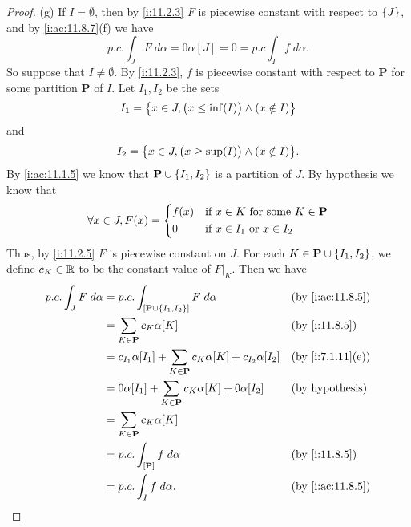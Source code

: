 \begin{proof}{(g)}
  If \(I = \emptyset\), then by \cref{i:11.2.3} \(F\) is piecewise constant with respect to \(\left\lbrace J\right\rbrace\), and by \cref{i:ac:11.8.7}(f) we have
  \[
    p.c. \int_J F \; d \alpha = 0 \alpha[J] = 0 = p.c \int_I f \; d \alpha.
  \]
  So suppose that \(I \neq \emptyset\).
  By \cref{i:11.2.3}, \(f\) is piecewise constant with respect to \(\mathbf{P}\) for some partition \(\mathbf{P}\) of \(I\).
  Let \(I_1, I_2\) be the sets
  \[
    I_1 = \left\lbrace x \in J, \big(x \leq \inf(I)\big) \land (x \notin I)\right\rbrace
  \]
  and
  \[
    I_2 = \set{x \in J, \big(x \geq \sup(I)\big) \land (x \notin I)}.
  \]
  By \cref{i:ac:11.1.5} we know that \(\mathbf{P} \cup \left\lbrace I_1, I_2\right\rbrace\) is a partition of \(J\).
  By hypothesis we know that
  \[
    \forall x \in J, F(x) = \begin{dcases}
      f(x) & \text{if } x \in K \text{ for some } K \in \mathbf{P} \\
      0    & \text{if } x \in I_1 \text{ or } x \in I_2
    \end{dcases}
  \]
  Thus, by \cref{i:11.2.5} \(F\) is piecewise constant on \(J\).
  For each \(K \in \mathbf{P} \cup \left\lbrace I_1, I_2\right\rbrace\), we define \(c_K \in \mathbb{R}\) to be the constant value of \(F|_K\).
  Then we have
  \begin{align*}
    p.c. \int_J F \; d \alpha & = p.c. \int_{[\mathbf{P} \cup \set{I_1, I_2}]} F \; d \alpha                        &  & \by{i:ac:11.8.5}       \\
                              & = \sum_{K \in \mathbf{P}} c_K \alpha[K]                                             &  & \by{i:11.8.5}          \\
                              & = c_{I_1} \alpha[I_1] + \sum_{K \in \mathbf{P}} c_K \alpha[K] + c_{I_2} \alpha[I_2] &  & \by{i:7.1.11}[e]       \\
                              & = 0 \alpha[I_1] + \sum_{K \in \mathbf{P}} c_K \alpha[K] + 0 \alpha[I_2]             &  & \text{(by hypothesis)} \\
                              & = \sum_{K \in \mathbf{P}} c_K \alpha[K]                                                                         \\
                              & = p.c. \int_{[\mathbf{P}]} f \; d \alpha                                            &  & \by{i:11.8.5}          \\
                              & = p.c. \int_I f \; d \alpha.                                                        &  & \by{i:ac:11.8.5}
  \end{align*}
\end{proof}

